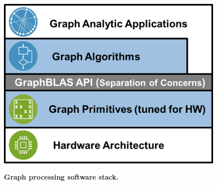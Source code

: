 \begin{figure}[t]
\includegraphics[width=\linewidth]{fig/gbtl}
\label{fig:gbtl}
\caption
{\textbf{Graph processing software stack.}}
\end{figure}
%
%


